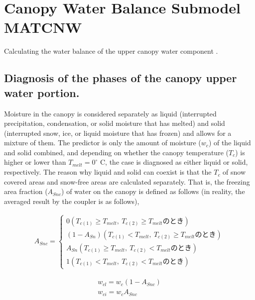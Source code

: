 \hypertarget{canopy-water-balance-submodel-matcnw}{%
\section{Canopy Water Balance Submodel
MATCNW}\label{canopy-water-balance-submodel-matcnw}}

Calculating the water balance of the upper canopy water component .

\hypertarget{diagnosis-of-the-phases-of-the-canopy-upper-water-portion.}{%
\subsection{Diagnosis of the phases of the canopy upper water
portion.}\label{diagnosis-of-the-phases-of-the-canopy-upper-water-portion.}}

Moisture in the canopy is considered separately as liquid (interrupted
precipitation, condensation, or solid moisture that has melted) and
solid (interrupted snow, ice, or liquid moisture that has frozen) and
allows for a mixture of them. The predictor is only the amount of
moisture (\(w_c\)) of the liquid and solid combined, and depending on
whether the canopy temperature (\(T_c\)) is higher or lower than
\(T_{melt} = 0^{\circ}\) C, the case is diagnosed as either liquid or
solid, respectively. The reason why liquid and solid can coexist is that
the \(T_c\) of snow covered areas and snow-free areas are calculated
separately. That is, the freezing area fraction (\(A_{Snc}\)) of water
on the canopy is defined as follows (in reality, the averaged result by
the coupler is as follows),

\begin{eqnarray}
 A_{Snc} = \left\{
\begin{array}{ll}
 0  (T_{c(1)} \geq T_{melt}, \ T_{c(2)} \geq T_{melt} {のとき})\\
 (1-A_{Sn})  (T_{c(1)} < T_{melt}, \ T_{c(2)} \geq T_{melt} {のとき})\\
 A_{Sn}  (T_{c(1)} \geq T_{melt}, \ T_{c(2)} < T_{melt} {のとき})\\
 1  (T_{c(1)} < T_{melt}, \ T_{c(2)} < T_{melt} {のとき})
\end{array}
\right.
\end{eqnarray}

\begin{eqnarray}
 w_{cl} = w_c ( 1 - A_{Snc}) \\
 w_{ci} = w_c A_{Snc}
\end{eqnarray}

